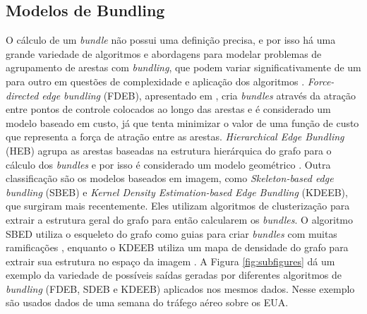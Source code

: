 \subsection{Modelos de Bundling}

  O cálculo de um \emph{bundle} não possui uma definição precisa, e por isso há
uma grande variedade de algoritmos e abordagens para modelar problemas de
agrupamento de arestas com \emph{bundling}, que podem variar significativamente
de um para outro em questões de complexidade e aplicação dos algoritmos
\citep{Zhou2013}.  \emph{Force-directed edge bundling} (FDEB), apresentado em
\citet{Holten2009}, cria \emph{bundles} através da atração entre pontos de
controle colocados ao longo das arestas e é considerado um modelo baseado em
custo, já que tenta minimizar o valor de uma função de custo que representa a
força de atração entre as arestas.  \emph{Hierarchical Edge Bundling} (HEB)
agrupa as arestas baseadas na estrutura hierárquica do grafo para o cálculo dos
\emph{bundles} e por isso é considerado um modelo geométrico \citep{Holten2006}. Outra
classificação são os modelos baseados em imagem, como \emph{Skeleton-based edge
bundling} (SBEB) e \emph{Kernel Density Estimation-based Edge Bundling}
(KDEEB), que surgiram mais recentemente. Eles utilizam algoritmos de
clusterização para extrair a estrutura geral do grafo para então calcularem os
\emph{bundles}. O algoritmo SBED utiliza o esqueleto do grafo como guias para
criar \emph{bundles} com muitas ramificações \citep{Ersoy2011}, enquanto o
KDEEB utiliza um mapa de densidade do grafo para extrair sua estrutura no
espaço da imagem \citep{Hurter2012}. A Figura \ref{fig:subfigures} dá um
exemplo da variedade de possíveis saídas geradas por diferentes algoritmos de
\emph{bundling} (FDEB, SDEB e KDEEB) aplicados nos mesmos dados.  Nesse exemplo
são usados dados de uma semana do tráfego aéreo sobre os EUA.

